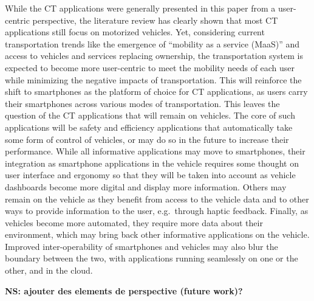 While the \acrshort{CT} applications were generally presented in this paper from a user-centric perspective, the literature review has clearly shown that most \acrshort{CT} applications still focus on motorized vehicles. Yet, considering current transportation trends like the emergence of ``mobility as a service (MaaS)'' and access to vehicles and services replacing ownership, the transportation system is expected to become more user-centric to meet the mobility needs of each user while minimizing the negative impacts of transportation. This will reinforce the shift to smartphones as the platform of choice for \acrshort{CT} applications, as users carry their smartphones across various modes of transportation. This leaves the question of the \acrshort{CT} applications that will remain on vehicles. The core of such applications will be safety and efficiency applications that automatically take some form of control of vehicles, or may do so in the future to increase their performance. While all informative applications may move to smartphones, their integration as smartphone applications in the vehicle requires some thought on user interface and ergonomy so that they will be taken into account as vehicle dashboards become more digital and display more information. Others may remain on the vehicle as they benefit from access to the vehicle data and to other ways to provide information to the user, e.g.\ through haptic feedback. Finally, as vehicles become more automated, they require more data about their environment, which may bring back other informative applications on the vehicle. Improved inter-operability of smartphones and vehicles may also blur the boundary between the two, with applications running seamlessly on one or the other, and in the cloud. 

{\bf NS: ajouter des elements de perspective (future work)?}





